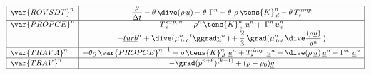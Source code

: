 \begin{equation}\label{Base_Predvv_tab_ext1}
\begin{array}{|l|c|}
\hline
\var{ROVSDT}^{n}
& \displaystyle
\frac{\rho}{\Delta t} -\theta \,\dive (\rho\,\underline {u}) +\theta \,\, \Gamma^n + \theta \,\, \rho\,\tens{K}_{\,d}^n-\theta \,T_s^{\,imp} \\
\hline
\var{PROPCE}^{n}
& \displaystyle
\underline{T}_{s}^{\,exp,\,n}-\,\rho^{n}\,\tens{K}_{\,e}^{n}\ \underline{u}^{n} + \,\Gamma^{n}\,\underline{u}_{\,i}^{n}\\
& \displaystyle
-\underline{turb}^{n}+ \dive (\mu_{\,tot}^{n}\,^t\ggrad \underline {u}^{n}\,)+ \frac {2} {3}\,\grad (\mu_{\,tot}^{n}\,\dive \frac{(\rho \underline {u})}{\rho^{n}}\,)\\
\hline
\var{TRAVA}^{n} &
\displaystyle
-\theta_S\,\var{PROPCE}^{n-1} -\rho\,\tens{K}_{\,d}^n\ \underline{u}^{n} + T_s^{\,imp}\,\,\underline {u}^{n} + \dive (\rho\,\underline {u})\,\underline{u}^{n} - \Gamma^n\,\,\underline{u}^{n}\\
\hline
\var{TRAV}^{n}
& \displaystyle
- \grad (p^{n+\theta})^{(k-1)} + (\rho -\rho_0) \underline {g} \\
\hline
\end{array}
\end{equation}


